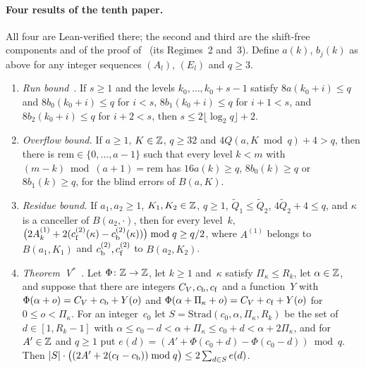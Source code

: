 \paragraph{Four results of the tenth paper.} All four are Lean-verified there; the second and third are the shift-free
components  and  of the proof
of~\cite[Theorem~5.5]{DirectedReciprocity2026} (its Regimes~2 and~3). Define $a(k)$, $b_j(k)$ as above for any integer
sequences $(A_l)$, $(E_l)$ and $q\ge3$.
\begin{enumerate}[label=(\Roman*)]
\item \emph{Run bound}~\cite[Theorem~5.3(2)]{DirectedReciprocity2026}. If $s\ge1$ and the levels $k_0,\dots,k_0+s-1$
  satisfy $8a(k_0+i)\le q$ and $8b_0(k_0+i)\le q$ for $i<s$, $8b_1(k_0+i)\le q$ for $i+1<s$, and $8b_2(k_0+i)\le q$ for
  $i+2<s$, then $s\le2\lfloor\log_2q\rfloor+2$.
\item \emph{Overflow bound.} If $a\ge1$, $K\in\mathbb{Z}$, $q\ge32$ and $4Q(a,K\bmod q)+4>q$, then there is
  $\mathrm{rem}\in\{0,\dots,a-1\}$ such that every level $k<m$ with $(m-k)\bmod(a+1)=\mathrm{rem}$ has
  $16a(k)\ge q$, $8b_0(k)\ge q$ or $8b_1(k)\ge q$, for the blind errors of $B(a,K)$.
\item \emph{Residue bound.} If $a_1,a_2\ge1$, $K_1,K_2\in\mathbb{Z}$, $q\ge1$, $\tilde Q_1\le\tilde Q_2$, $4\tilde Q_2+4\le q$, and
  $\kappa$ is a canceller of $B(a_2,\cdot)$, then for every level~$k$,
  $\bigl(2A^{(1)}_k+2(c^{(2)}_{\mathrm{f}}(\kappa)-c^{(2)}_{\mathrm{b}}(\kappa))\bigr)\bmod q\ge q/2$, where $A^{(1)}$ belongs to
  $B(a_1,K_1)$ and $c^{(2)}_{\mathrm{b}},c^{(2)}_{\mathrm{f}}$ to $B(a_2,K_2)$.
\item \emph{Theorem~V$^*$}~\cite[Theorem~5.2(2)]{DirectedReciprocity2026}. Let $\Phi\colon\mathbb{Z}\to\mathbb{Z}$, let $k\ge1$
  and~$\kappa$ satisfy $\Pi_\kappa\le R_k$, let $\alpha\in\mathbb{Z}$, and suppose that there are integers $C_V,c_{\mathrm{b}},c_{\mathrm{f}}$
  and a function~$Y$ with $\Phi(\alpha+o)=C_V+c_{\mathrm{b}}+Y(o)$ and $\Phi(\alpha+\Pi_\kappa+o)=C_V+c_{\mathrm{f}}+Y(o)$ for
  $0\le o<\Pi_\kappa$. For an integer~$c_0$ let $S=\mathrm{Strad}(c_0,\alpha,\Pi_\kappa,R_k)$ be the set of $d\in[1,R_k-1]$
  with $\alpha\le c_0-d<\alpha+\Pi_\kappa\le c_0+d<\alpha+2\Pi_\kappa$, and for $A'\in\mathbb{Z}$ and $q\ge1$ put
  $e(d)=(A'+\Phi(c_0+d)-\Phi(c_0-d))\bmod q$. Then
  $\lvert S \rvert\cdot\bigl((2A'+2(c_{\mathrm{f}}-c_{\mathrm{b}}))\bmod q\bigr)\le2\sum_{d\in S}e(d)$.
\end{enumerate}

